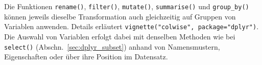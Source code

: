Die Funktionen \lstinline!rename()!, \lstinline!filter()!, \lstinline!mutate()!, \lstinline!summarise()! und \lstinline!group_by()! können jeweils dieselbe Transformation auch gleichzeitig auf Gruppen von Variablen anwenden. Details erläutert \lstinline!vignette("colwise", package="dplyr")!. Die Auswahl von Variablen erfolgt dabei mit denselben Methoden wie bei \lstinline!select()! (Abschn.\ \ref{sec:dplyr_subset}) anhand von Namensmustern, Eigenschaften oder über ihre Position im Datensatz.

%

